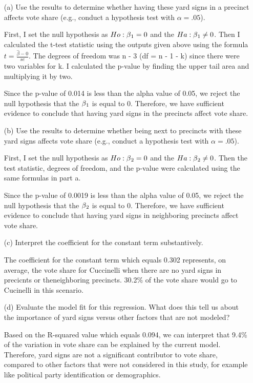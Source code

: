 \documentclass[12pt,letterpaper]{article}
\begin{document}
\vspace{.5cm}
\begin{enumerate}
	\item [(a)] Use the results to determine whether having these yard signs in a precinct affects vote share (e.g., conduct a hypothesis test with $\alpha = .05$).
	
	First, I set the null hypothesis as $Ho: \beta\textsubscript{1} = 0$ and the  $Ha: \beta\textsubscript{1} \neq 0$. Then I calculated the t-test statistic using the outputs given above using the formula $ t = \frac{\hat{\beta} - 0}{se}$. The degrees of freedom was n - 3 (df = n - 1 - k) since there were two variables for k. I calculated the p-value by finding the upper tail area and multiplying it by two.
	
	 
	
	Since the p-value of 0.014 is less than the alpha value of 0.05, we reject the null hypothesis that the $\beta\textsubscript{1} $ is equal to 0. Therefore, we have sufficient evidence to conclude that having yard signs in the precincts affect vote share.
	
	\item [(b)]  Use the results to determine whether being
	next to precincts with these yard signs affects vote
	share (e.g., conduct a hypothesis test with $\alpha = .05$).
	
	First, I set the null hypothesis as $Ho: \beta\textsubscript{2} = 0$ and the  $Ha: \beta\textsubscript{2} \neq 0$. Then the test statistic, degrees of freedom, and the p-value were calculated using the same formulas in part a.
	
	 
	
	Since the p-value of 0.0019 is less than the alpha value of 0.05, we reject the null hypothesis that the $\beta\textsubscript{2} $ is equal to 0. Therefore, we have sufficient evidence to conclude that having yard signs in neighboring  precincts affect vote share.
	
	\item [(c)] Interpret the coefficient for the constant term substantively.
	
	The coefficient for the constant term which equals 0.302 represents,  on average, the vote share for Cuccinelli when there are no yard signs in precicnts or theneighboring precincts. 30.2\% of the vote share would go to Cucinelli in this scenario.
	
	\item [(d)] Evaluate the model fit for this regression. What does this	tell us about the importance of yard signs versus other factors that are not modeled?
	
	 Based on the R-squared value which  equals 0.094, we can interpret that 9.4\% of the variation in vote share can be explained by the current model. Therefore, yard signs are not a significant contributor to vote share, compared to other factors that were not considered in this study, for example like  political party identification or demographics. 
	
\end{enumerate}  

\newpage
\end{document}
